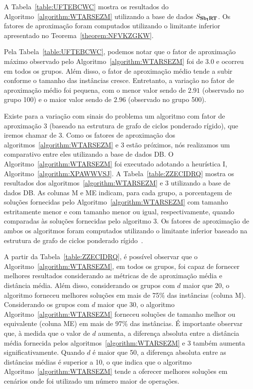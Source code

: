 A Tabela~\ref{table:UFTEBCWC} mostra os resultados do Algoritmo~\ref{algorithm:WTARSEZM} utilizando a base de dados $S_{\textbf{Sb\textsubscript{I}RT}}{}$. Os fatores de aproximação foram computados utilizando o limitante inferior apresentado no Teorema~\ref{theorem:NFVKZGKW}.



Pela Tabela~\ref{table:UFTEBCWC}, podemos notar que o fator de aproximação máximo observado pelo Algoritmo~\ref{algorithm:WTARSEZM} foi de $3.0$ e ocorreu em todos os grupos. Além disso, o fator de aproximação médio tende a subir conforme o tamanho das instâncias cresce. Entretanto, a variação no fator de aproximação médio foi pequena, com o menor valor sendo de $2.91$ (observado no grupo 100) e o maior valor sendo de $2.96$ (observado no grupo 500).

Existe para a variação com sinais do problema \SbIRT{} um algoritmo com fator de aproximação $3$ (baseado na estrutura de grafo de ciclos ponderado rígido), que iremos chamar de $3$\SbIRT{}. Como os fatores de aproximação dos algoritmos~\ref{algorithm:WTARSEZM} e $3$\SbIRT{} estão próximos, nós realizamos um comparativo entre eles utilizando a base de dados DB\textsubscript{\SbIRT}. O Algoritmo~\ref{algorithm:WTARSEZM} foi executado adotando a heurística I, Algoritmo~\ref{algorithm:XPAWWVSJ}. A Tabela~\ref{table:ZZECIDRQ} mostra os resultados dos algoritmos~\ref{algorithm:WTARSEZM} e $3$\SbIRT{} utilizando a base de dados DB\textsubscript{\SbIRT}. As colunas M e ME indicam, para cada grupo, a porcentagem de soluções fornecidas pelo Algoritmo~\ref{algorithm:WTARSEZM} com tamanho estritamente menor e com tamanho menor ou igual, respectivamente, quando comparadas às soluções fornecidas pelo algoritmo $3$\SbIRT{}. Os fatores de aproximação de ambos os algoritmos foram computados utilizando o limitante inferior baseado na estrutura de grafo de ciclos ponderado rígido~\cite[Teorema 3.8]{2021a-oliveira-etal}. 



A partir da Tabela~\ref{table:ZZECIDRQ}, é possível observar que o Algoritmo~\ref{algorithm:WTARSEZM}, em todos os grupos, foi capaz de fornecer melhores resultados considerando as métricas de de aproximação média e distância média. Além disso, considerando os grupos com $d$ maior que 20, o algoritmo forneceu melhores soluções em mais de 75\% das instâncias (coluna M). Considerando os grupos com $d$ maior que 30, o algoritmo Algoritmo~\ref{algorithm:WTARSEZM} forneceu soluções de tamanho melhor ou equivalente (coluna ME) em mais de 97\% das instâncias. É importante observar que, à medida que o valor de $d$ aumenta, a diferença absoluta entre a distância média fornecida pelos algoritmos~\ref{algorithm:WTARSEZM} e 3\SbIRT{} também aumenta significativamente. Quando $d$ é maior que 50, a diferença absoluta entre as distâncias médias é superior a 10, o que indica que o algoritmo Algoritmo~\ref{algorithm:WTARSEZM} tende a oferecer melhores soluções em cenários onde foi utilizado um número maior de operações.

